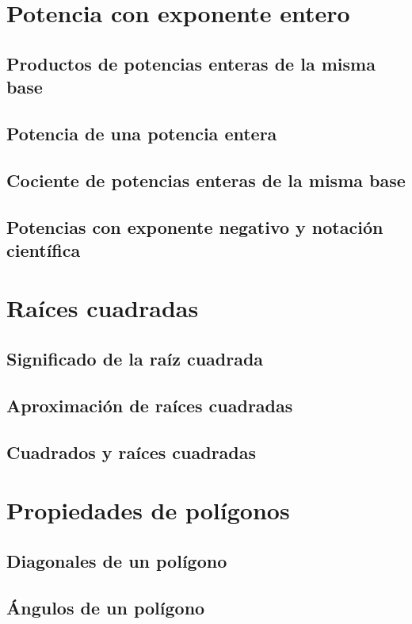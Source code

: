 \documentclass[11pt]{book}
\begin{document}
\section{Potencia con exponente entero}
\subsection{Productos de potencias enteras de la misma base}
\subsection{Potencia de una potencia entera}
\subsection{Cociente de potencias enteras de la misma base}
\subsection{Potencias con exponente negativo y notación científica}

\newpage \thispagestyle{plain}
\section{Raíces cuadradas}
\subsection{Significado de la raíz cuadrada}
\subsection{Aproximación de raíces cuadradas}
\subsection{Cuadrados y raíces cuadradas}

\newpage \thispagestyle{plain}
\section{Propiedades de polígonos}
\subsection{Diagonales de un polígono}
\subsection{Ángulos de un polígono}
\end{document}
